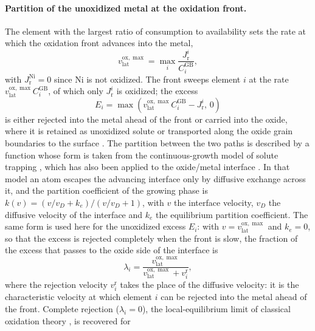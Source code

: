 \documentclass[3p,times]{elsarticle} %
\newcommand{\GB}{\mathrm{GB}}
\newcommand{\lat}{\mathrm{lat}}
\newcommand{\ox}{\mathrm{ox}}
\begin{document}
\paragraph{Partition of the unoxidized metal at the oxidation front.}
The element with the largest ratio of consumption to availability sets the rate
at which the oxidation front advances into the metal,
\begin{equation}
v_{\lat}^{\ox,\max}=\max_{i}\frac{J_{\mathrm{r}}^{i}}{C_i^{\GB}} ,
\label{eq:sweep-velocity}
\end{equation}
with \(J_{\mathrm{r}}^{\mathrm{Ni}}=0\) since Ni is not oxidized. The front
sweeps element \(i\) at the rate \(v_{\lat}^{\ox,\max}C_i^{\GB}\), of which only
\(J_{\mathrm{r}}^{i}\) is oxidized; the excess
\begin{equation}
E_i=\max\!\left(v_{\lat}^{\ox,\max}C_i^{\GB}-J_{\mathrm{r}}^{i},\,0\right)
\label{eq:excess}
\end{equation}
is either rejected into the metal ahead of the front or carried into the oxide,
where it is retained as unoxidized solute or transported along the oxide grain
boundaries to the surface \cite{deng2020corrosion}. The partition between
the two paths is described by a function whose form is taken from the
continuous-growth model of solute trapping
\cite{aziz1982model,aziz1988continuous}, which has also been applied to
the oxide/metal interface
\cite{yu2018nonequilibrium,sherman2019thermodynamics}. In that model an
atom escapes the advancing interface only by diffusive exchange across it, and
the partition coefficient of the growing phase is
\(k(v)=(v/v_D+k_e)/(v/v_D+1)\), with \(v\) the interface velocity, \(v_D\) the
diffusive velocity of the interface and \(k_e\) the equilibrium partition
coefficient. The same form is used here for the unoxidized excess \(E_i\):
with \(v=v_{\lat}^{\ox,\max}\) and \(k_e=0\), so that the excess is rejected
completely when the front is slow, the fraction of the excess that passes to
the oxide side of the interface is
\begin{equation}
\lambda_i=\frac{v_{\lat}^{\ox,\max}}{v_{\lat}^{\ox,\max}+v_i^{\mathrm{r}}} ,
\label{eq:capture-fraction}
\end{equation}
where the rejection velocity \(v_i^{\mathrm{r}}\) takes the place of the
diffusive velocity: it is the characteristic velocity at which element \(i\)
can be rejected into the metal ahead of the front. Complete rejection
(\(\lambda_i=0\)), the local-equilibrium limit of classical oxidation theory
\cite{sherman2019thermodynamics}, is recovered for
\end{document}

